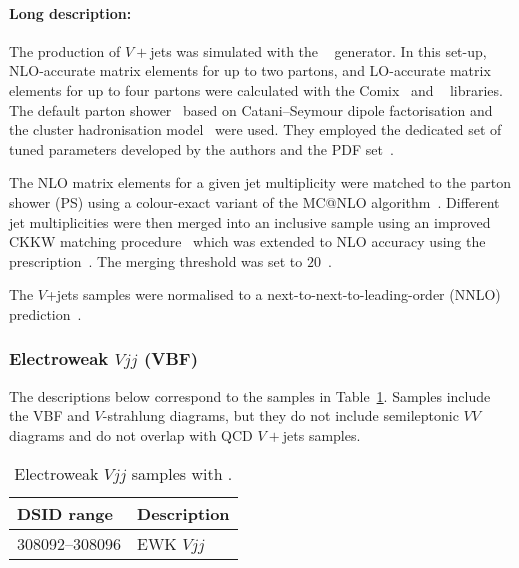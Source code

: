 \paragraph{Long description:}

The production of $V+$jets was simulated with the \SHERPA[2.2.1]~\cite{Bothmann:2019yzt}
generator. In this set-up, NLO-accurate matrix elements for up to two partons, and LO-accurate matrix elements for up
to four partons were calculated with the Comix~\cite{Gleisberg:2008fv} and
\OPENLOOPS~\cite{Buccioni:2019sur,Cascioli:2011va,Denner:2016kdg} libraries.
The default \SHERPA parton shower~\cite{Schumann:2007mg} based on
Catani--Seymour dipole factorisation and the cluster hadronisation model~\cite{Winter:2003tt}
were used. They employed the dedicated set of tuned parameters developed by the
\SHERPA authors and the \NNPDF[3.0nnlo] PDF set~\cite{Ball:2014uwa}.

The NLO matrix elements for a given jet multiplicity were matched to the parton
shower (PS) using a colour-exact variant of the MC@NLO
algorithm~\cite{Hoeche:2011fd}. Different jet multiplicities were then merged
into an inclusive sample using an improved CKKW matching
procedure~\cite{Catani:2001cc,Hoeche:2009rj} which was extended to NLO
accuracy using the \MEPSatNLO prescription~\cite{Hoeche:2012yf}. The merging threshold 
was set to $20$~\GeV.



The $V$+jets samples were normalised to a next-to-next-to-leading-order (NNLO) 
prediction~\cite{Anastasiou:2003ds}.


\subsubsection{Electroweak $Vjj$ (VBF)}

The descriptions below correspond to the samples in
Table~\ref{tab:ewkvjets-sherpa}.  Samples include the VBF and $V$-strahlung diagrams, but 
they do not include semileptonic $VV$ diagrams and do not overlap with QCD $V+$jets samples.

\begin{table}[!htbp]
  \caption{Electroweak $Vjj$ samples with \SHERPA.}%
  \label{tab:ewkvjets-sherpa}
  \centering
  \begin{tabular}{l l}
    \toprule
    DSID range & Description \\
    \midrule
    308092--308096 & EWK $Vjj$ \\
    \bottomrule
  \end{tabular}
\end{table}

